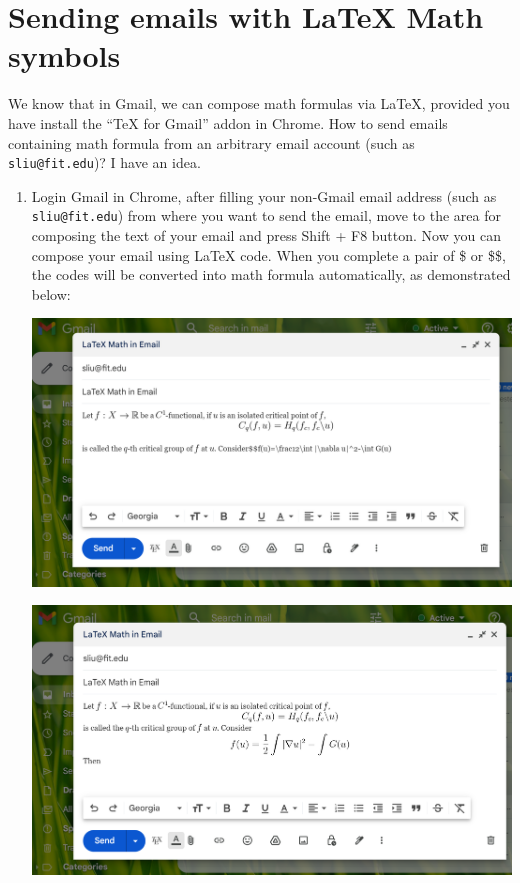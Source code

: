 \documentclass[12pt,landscape]{amsproc}
\begin{document}
\section*{Sending emails with \LaTeX{} Math symbols}

We know that in Gmail, we can compose math formulas via \LaTeX, provided you have install the ``TeX for Gmail'' addon in Chrome. How to send emails containing math formula from an arbitrary email account (such as \verb|sliu@fit.edu|)? I have an idea.

\begin{enumerate}
\item Login Gmail in Chrome, after f{}illing your non-Gmail email address (such as \verb|sliu@fit.edu|) from where you want to send the email, move to the area for composing the text of your email and press Shift + F8 button. Now you can compose your email using \LaTeX{} code. When you complete a pair of \$ or \$\$, the codes will be converted into math formula automatically, as demonstrated below:

\noindent\includegraphics[width=20cm]{em-4}

\noindent\includegraphics[width=20cm]{em-5}


\end{enumerate}
\end{document}
